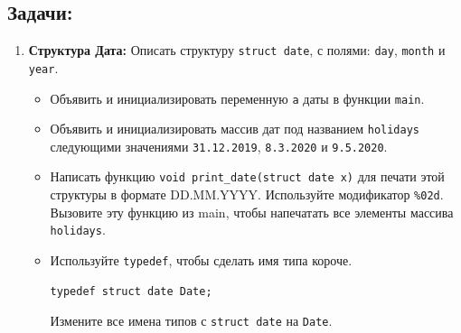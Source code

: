\documentclass{article}
\begin{document}
\subsection*{Задачи:}
\begin{enumerate}
\item \textbf{Структура Дата:} Описать структуру \texttt{struct date}, с полями: \texttt{day}, \texttt{month} и \texttt{year}. 
\begin{itemize}
\item Объявить и инициализировать переменную \texttt{a} даты в функции \texttt{main}.
\item Объявить и инициализировать массив дат под названием \texttt{holidays} следующими значениями \texttt{31.12.2019}, \texttt{8.3.2020} и \texttt{9.5.2020}.
\item Написать функцию \texttt{void print\_date(struct date x)} для печати этой структуры в формате DD.MM.YYYY. Используйте модификатор \texttt{\%02d}. Вызовите эту функцию из main, чтобы напечатать все элементы массива \texttt{holidays}.

\item Используйте \texttt{typedef}, чтобы сделать имя типа короче. 
\begin{lstlisting}
typedef struct date Date;
\end{lstlisting}
Измените все имена типов с \texttt{struct date} на \texttt{Date}.
\end{itemize}


\end{enumerate}
\end{document}
